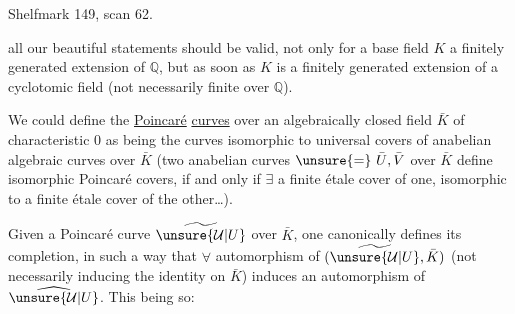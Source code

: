 Shelfmark 149, scan 62.

all our beautiful statements should be valid, not only for a base field $K$ a finitely generated extension of $\mathbb{Q}$, but as soon as $K$ is a finitely generated extension of a cyclotomic field (not necessarily finite over $\mathbb{Q}$).

We could define the \uline{Poincaré} \uline{curves} over an algebraically closed field $\bar K$ of characteristic $0$ as being the curves isomorphic to universal covers of anabelian algebraic curves over $\bar K$ (two anabelian curves $\unsure{=}\ \bar U,\bar V$ over $\bar K$ define isomorphic Poincaré covers, if and only if $\exists$ a finite étale cover of one, isomorphic to a finite étale cover of the other\ldots).

Given a Poincaré curve $\widetilde{\unsure{\mathcal U|U}}$ over $\bar K$,  one canonically defines its completion, in such a way that $\forall$ automorphism of $(\widetilde{\unsure{\mathcal U|U}},\bar K)$ (not necessarily inducing the identity on $\bar K$) induces an automorphism of $\widehat{\unsure{\mathcal U|U}}$.
This being so:
